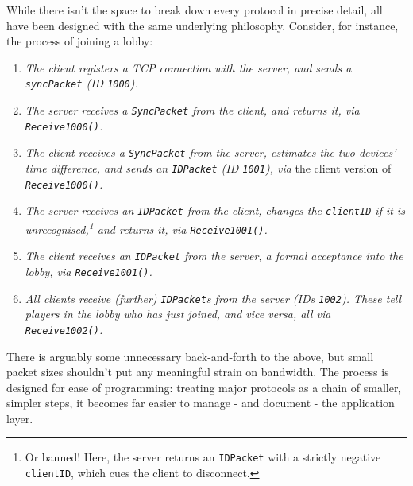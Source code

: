 \documentclass[a4paper, 9pt]{article}
\begin{document}
\begin{flushleft}
\vspace{5pt}\noindent
While there isn't the space to break down every protocol in precise detail, all have been designed with the same underlying philosophy. Consider, for instance, the process of joining a lobby:
\begin{enumerate}[label=\textit{\arabic*}\textit{.}, noitemsep]
\item \textit{The client registers a TCP connection with the server, and sends a \texttt{syncPacket} (ID \texttt{1000}).} %
\item \textit{The server receives a \texttt{SyncPacket} from the client, and returns it, via \texttt{Receive1000()}.} %
\item \textit{The client receives a \texttt{SyncPacket} from the server, estimates the two devices' time difference, and sends an \texttt{IDPacket} (ID \texttt{1001}), via} the client version of \textit{\texttt{Receive1000()}.} %
\item \textit{The server receives an \texttt{IDPacket} from the client, changes the \texttt{clientID} if it is unrecognised,\footnote{Or banned! Here, the server returns an \texttt{IDPacket} with a strictly negative \texttt{clientID}, which cues the client to disconnect.} and returns it, via \texttt{Receive1001()}.} %
\item \textit{The client receives an \texttt{IDPacket} from the server, a formal acceptance into the lobby, via \texttt{Receive1001()}.} %
\item \textit{All clients receive (further) \texttt{IDPacket}s from the server (IDs \texttt{1002}). These tell players in the lobby who has just joined, and vice versa, all via \texttt{Receive1002()}.}
\end{enumerate}
There is arguably some unnecessary back-and-forth to the above, but small packet sizes shouldn't put any meaningful strain on bandwidth. The process is designed for ease of programming: treating major protocols as a chain of smaller, simpler steps, it becomes far easier to manage - and document - the application layer. 



\end{flushleft}
\end{document}
